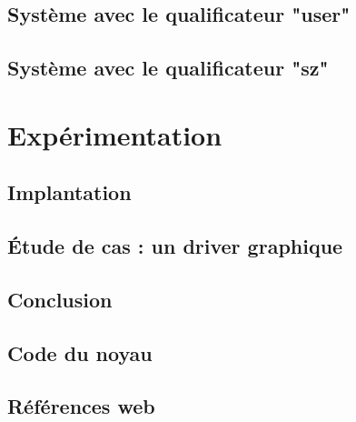 \documentclass[a4paper,11pt]{memoir}
\begin{document}
\label{cha:typbase}


\chapter{Système avec le qualificateur "user"}



\chapter{Système avec le qualificateur "sz"}



\part{Expérimentation}

\chapter{Implantation}

\label{cha:implem}


\chapter{Étude de cas : un driver graphique}


\chapter{Conclusion}



\appendix

\chapter{Code du noyau}


\backmatter


\listoffigures

\chapter{Références web}

\insertlinks



\end{document}
